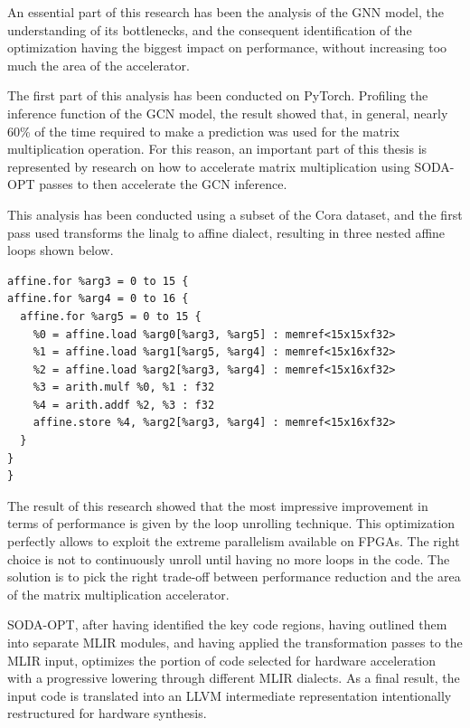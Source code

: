 An essential part of this research has been the analysis of the GNN model, the understanding of its bottlenecks, and the consequent identification of the optimization having the biggest impact on performance, without increasing too much the area of the accelerator.

The first part of this analysis has been conducted on PyTorch.
Profiling the inference function of the GCN model, the result showed that, in general, nearly 60\% of the time required to make a prediction was used for the matrix multiplication operation.
For this reason, an important part of this thesis is represented by research on how to accelerate matrix multiplication using SODA-OPT passes to then accelerate the GCN inference.

This analysis has been conducted using a subset of the Cora dataset, and the first pass used transforms the linalg to affine dialect, resulting in three nested affine loops shown below.

\begin{lstlisting}[label={lst:affine-mul}, caption=Matrix multiplication in MLIR affine dialect]
affine.for %arg3 = 0 to 15 {
affine.for %arg4 = 0 to 16 {
  affine.for %arg5 = 0 to 15 {
    %0 = affine.load %arg0[%arg3, %arg5] : memref<15x15xf32>
    %1 = affine.load %arg1[%arg5, %arg4] : memref<15x16xf32>
    %2 = affine.load %arg2[%arg3, %arg4] : memref<15x16xf32>
    %3 = arith.mulf %0, %1 : f32
    %4 = arith.addf %2, %3 : f32
    affine.store %4, %arg2[%arg3, %arg4] : memref<15x16xf32>
  }
}
}
\end{lstlisting}

The result of this research showed that the most impressive improvement in terms of performance is given by the loop unrolling technique.
This optimization perfectly allows to exploit the extreme parallelism available on FPGAs.
The right choice is not to continuously unroll until having no more loops in the code.
The solution is to pick the right trade-off between performance reduction and the area of the matrix multiplication accelerator.

SODA-OPT, after having identified the key code regions, having outlined them into separate MLIR modules, and having applied the transformation passes to the MLIR input, optimizes the portion of code selected for hardware acceleration with a progressive lowering through different MLIR dialects.
As a final result, the input code is translated into an LLVM intermediate representation intentionally restructured for hardware synthesis.

